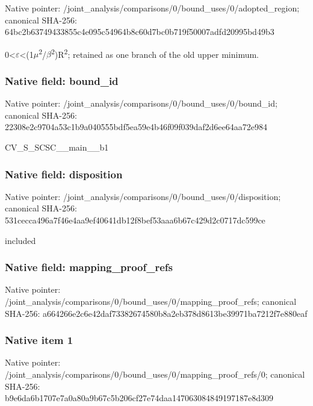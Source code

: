 \documentclass[10pt,a4paper]{article}
\begin{document}
Native pointer: /joint\_analysis/comparis\allowbreak{}ons/0/bound\_uses/0/adopt\allowbreak{}ed\_region; canonical SHA-256: 64bc2b63749433855c4e095c\allowbreak{}54964b8c60d7bc0b719f5000\allowbreak{}7adfd20995bd49b3


0<\ensuremath{\varepsilon}<(1\ensuremath{\mu}\textsuperscript{2}/\ensuremath{\beta}\textsuperscript{2})R\textsuperscript{2}; retained as one branch of the old upper minimum.


\subsubsection{Native field: bound\_id}


Native pointer: /joint\_analysis/comparis\allowbreak{}ons/0/bound\_uses/0/bound\allowbreak{}\_id; canonical SHA-256: 22308e2c9704a53c1b9a0405\allowbreak{}55bdf5ea59e4b46f09f039da\allowbreak{}f2d6ee64aa72e984


CV\_S\_SCSC\_\_main\_\_b1


\subsubsection{Native field: disposition}


Native pointer: /joint\_analysis/comparis\allowbreak{}ons/0/bound\_uses/0/dispo\allowbreak{}sition; canonical SHA-256: 531cecca496a7f46e4aa9ef4\allowbreak{}0641db12f8bef53aaa6b67c4\allowbreak{}29d2c0717dc599ce


included


\subsubsection{Native field: mapping\_proof\_refs}


Native pointer: /joint\_analysis/comparis\allowbreak{}ons/0/bound\_uses/0/mappi\allowbreak{}ng\_proof\_refs; canonical SHA-256: a664266e2c6e42daf7338267\allowbreak{}4580b8a2eb378d8613be3997\allowbreak{}1ba7212f7e880eaf



\subsubsection{Native item 1}


Native pointer: /joint\_analysis/comparis\allowbreak{}ons/0/bound\_uses/0/mappi\allowbreak{}ng\_proof\_refs/0; canonical SHA-256: b9e6da6b1707e7a0a80a9b67\allowbreak{}c5b206cf27e74daa14706308\allowbreak{}4849197187e8d309
\end{document}
